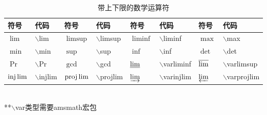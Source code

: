 \documentclass[UTF8,fontset=ubuntu]{ctexart}
\begin{document}
\begin{table}[H]
\begin{tabular}{l l l l l l l l}
	\hline
	符号 & 代码 & 符号 & 代码 & 符号 & 代码 & 符号 & 代码\\
	\hline
	$\lim$ & $\backslash$lim & $\limsup$ & $\backslash$limsup & $\liminf$ & $\backslash$liminf & $\max$ & $\backslash$max\\
	$\min$ & $\backslash$min & $\sup$ & $\backslash$sup & $\inf$ & $\backslash$inf & $\det$ & $\backslash$det\\
	$\Pr$ & $\backslash$Pr & $\gcd$ & $\backslash$gcd & $\varliminf$ & $\backslash$varliminf & $\varlimsup$ & $\backslash$varlimsup\\
	$\injlim$ & $\backslash$injlim & $\projlim$ & $\backslash$projlim & $\varinjlim$ & $\backslash$varinjlim & $\varprojlim$ & $\backslash$varprojlim\\
	\hline
\end{tabular}\\[2mm]
**$\backslash$var类型需要amsmath宏包
\caption{带上下限的数学运算符}
\end{table}
\end{document}

